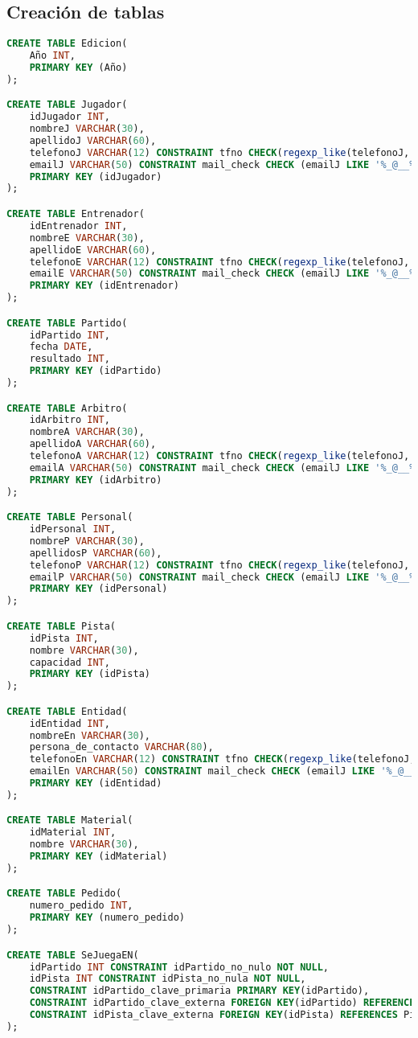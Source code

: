 \subsection{Creación de tablas}
\begin{lstlisting}[language=sql]
CREATE TABLE Edicion(
	Año INT,
	PRIMARY KEY (Año)
);

CREATE TABLE Jugador(
	idJugador INT,
	nombreJ VARCHAR(30),
	apellidoJ VARCHAR(60),
	telefonoJ VARCHAR(12) CONSTRAINT tfno CHECK(regexp_like(telefonoJ,'^[/+]?[0-9]')),
	emailJ VARCHAR(50) CONSTRAINT mail_check CHECK (emailJ LIKE '%_@__%.__%'),
	PRIMARY KEY (idJugador)
);

CREATE TABLE Entrenador(
	idEntrenador INT,
	nombreE VARCHAR(30),
	apellidoE VARCHAR(60),
	telefonoE VARCHAR(12) CONSTRAINT tfno CHECK(regexp_like(telefonoJ,'^[/+]?[0-9]')),
	emailE VARCHAR(50) CONSTRAINT mail_check CHECK (emailJ LIKE '%_@__%.__%'),
	PRIMARY KEY (idEntrenador)
);

CREATE TABLE Partido(
	idPartido INT,
	fecha DATE,
	resultado INT,
	PRIMARY KEY (idPartido)
);

CREATE TABLE Arbitro(
	idArbitro INT,
	nombreA VARCHAR(30),
	apellidoA VARCHAR(60),
	telefonoA VARCHAR(12) CONSTRAINT tfno CHECK(regexp_like(telefonoJ,'^[/+]?[0-9]')),
	emailA VARCHAR(50) CONSTRAINT mail_check CHECK (emailJ LIKE '%_@__%.__%'),
	PRIMARY KEY (idArbitro)
);

CREATE TABLE Personal(
	idPersonal INT,
	nombreP VARCHAR(30),
	apellidosP VARCHAR(60),
	telefonoP VARCHAR(12) CONSTRAINT tfno CHECK(regexp_like(telefonoJ,'^[/+]?[0-9]')),
	emailP VARCHAR(50) CONSTRAINT mail_check CHECK (emailJ LIKE '%_@__%.__%'),
	PRIMARY KEY (idPersonal)
);

CREATE TABLE Pista(
	idPista INT,
	nombre VARCHAR(30),
	capacidad INT,
	PRIMARY KEY (idPista)
);

CREATE TABLE Entidad(
	idEntidad INT,
	nombreEn VARCHAR(30),
	persona_de_contacto VARCHAR(80),
	telefonoEn VARCHAR(12) CONSTRAINT tfno CHECK(regexp_like(telefonoJ,'^[/+]?[0-9]')),
	emailEn VARCHAR(50) CONSTRAINT mail_check CHECK (emailJ LIKE '%_@__%.__%'),
	PRIMARY KEY (idEntidad)
);

CREATE TABLE Material(
	idMaterial INT,
	nombre VARCHAR(30),
	PRIMARY KEY (idMaterial)
);

CREATE TABLE Pedido(
	numero_pedido INT,
	PRIMARY KEY (numero_pedido)
);

CREATE TABLE SeJuegaEN(
	idPartido INT CONSTRAINT idPartido_no_nulo NOT NULL,
	idPista INT CONSTRAINT idPista_no_nula NOT NULL,
	CONSTRAINT idPartido_clave_primaria PRIMARY KEY(idPartido),
	CONSTRAINT idPartido_clave_externa FOREIGN KEY(idPartido) REFERENCES Partido(idPartido),
	CONSTRAINT idPista_clave_externa FOREIGN KEY(idPista) REFERENCES Pista(idPista)
);


\end{lstlisting}
